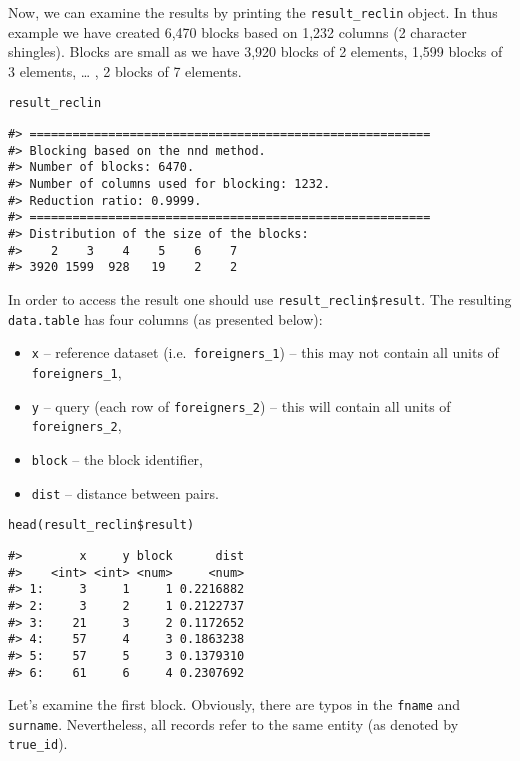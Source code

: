 Now, we can examine the results by printing the
\texttt{result\_reclin} object. In thus example we have created
6,470
blocks based on 1,232
columns (2 character shingles). Blocks are small as we have
3,920 blocks of 2
elements, 1,599 blocks of
3 elements, \ldots{} ,
2 blocks of
7 elements.

\begin{verbatim}
result_reclin
\end{verbatim}

\begin{verbatim}
#> ========================================================
#> Blocking based on the nnd method.
#> Number of blocks: 6470.
#> Number of columns used for blocking: 1232.
#> Reduction ratio: 0.9999.
#> ========================================================
#> Distribution of the size of the blocks:
#>    2    3    4    5    6    7 
#> 3920 1599  928   19    2    2
\end{verbatim}

In order to access the result one should use \texttt{result\_reclin\$result}. The
resulting \texttt{data.table} has four columns (as presented below):

\begin{itemize}
\tightlist
\item
  \texttt{x} -- reference dataset (i.e.~\texttt{foreigners\_1}) -- this may not
  contain all units of \texttt{foreigners\_1},
\item
  \texttt{y} -- query (each row of \texttt{foreigners\_2}) -- this will contain all
  units of \texttt{foreigners\_2},
\item
  \texttt{block} -- the block identifier,
\item
  \texttt{dist} -- distance between pairs.
\end{itemize}

\begin{verbatim}
head(result_reclin$result)
\end{verbatim}

\begin{verbatim}
#>        x     y block      dist
#>    <int> <int> <num>     <num>
#> 1:     3     1     1 0.2216882
#> 2:     3     2     1 0.2122737
#> 3:    21     3     2 0.1172652
#> 4:    57     4     3 0.1863238
#> 5:    57     5     3 0.1379310
#> 6:    61     6     4 0.2307692
\end{verbatim}

Let's examine the first block. Obviously, there are typos in the \texttt{fname}
and \texttt{surname}. Nevertheless, all records refer to the same entity (as denoted by \texttt{true\_id}).

